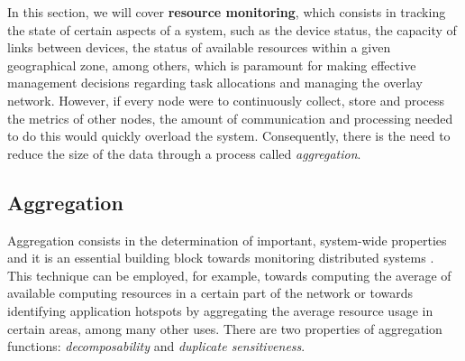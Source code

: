 



In this section, we will cover \textbf{resource monitoring}, which consists in tracking the state of certain aspects of a system, such as the device status, the capacity of links between devices, the status of available resources within a given geographical zone, among others, which is paramount for making effective management decisions regarding task allocations and managing the overlay network. However, if every node were to continuously collect, store and process the metrics of other nodes, the amount of communication and processing needed to do this would quickly overload the system. Consequently, there is the need to reduce the size of the data through a process called \textit{aggregation}.

\subsection{Aggregation}

Aggregation consists in the determination of important, system-wide properties and it is an essential building block towards monitoring distributed systems \cite{akosThesis} \cite{DBLP:journals/corr/abs-1110-0725}. This technique can be employed, for example, towards computing the average of available computing resources in a certain part of the network or towards identifying application hotspots by aggregating the average resource usage in certain areas, among many other uses. There are two properties of aggregation functions: \textit{decomposability} and \textit{duplicate sensitiveness}.

